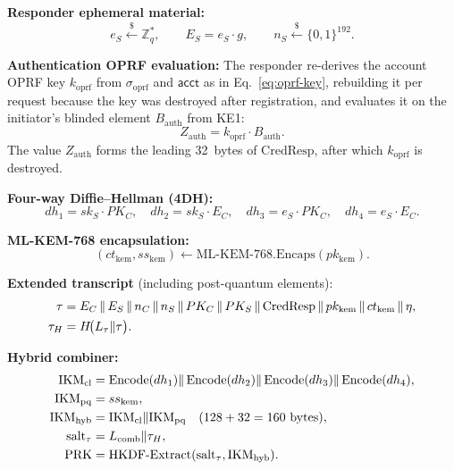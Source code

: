 \documentclass[preprint,12pt]{elsarticle}
\newcommand{\acct}{\mathsf{acct}}
\newcommand{\sigoprf}{\sigma_{\mathrm{oprf}}}
\newcommand{\Label}[1]{L_{\mathrm{#1}}}
\theoremstyle{remark}
\begin{document}
\textbf{Responder ephemeral material:}
\begin{equation}
  e_S \xleftarrow{\$} \mathbb{Z}_q^*,\qquad
  E_S = e_S \cdot g,\qquad
  n_S \xleftarrow{\$} \{0,1\}^{192}.
\end{equation}

\textbf{Authentication OPRF evaluation:} The responder re-derives the
account OPRF key $k_{\mathrm{oprf}}$ from $\sigoprf$ and $\acct$ as in
Eq.~\eqref{eq:oprf-key}, rebuilding it per request because the key was
destroyed after registration, and evaluates it on the initiator's
blinded element $B_{\mathrm{auth}}$ from KE1:
\begin{equation}
  Z_{\mathrm{auth}} = k_{\mathrm{oprf}} \cdot B_{\mathrm{auth}}.
\end{equation}
The value $Z_{\mathrm{auth}}$ forms the leading 32~bytes of
$\mathrm{CredResp}$, after which $k_{\mathrm{oprf}}$ is destroyed.

\textbf{Four-way Diffie--Hellman (4DH):}
\begin{equation}
  dh_1 = sk_S \cdot PK_C,\quad
  dh_2 = sk_S \cdot E_C,\quad
  dh_3 = e_S \cdot PK_C,\quad
  dh_4 = e_S \cdot E_C.
\end{equation}

\textbf{ML-KEM-768 encapsulation:}
\begin{equation}
  (ct_{\mathrm{kem}}, ss_{\mathrm{kem}})
    \leftarrow \mathrm{ML\text{-}KEM\text{-}768.Encaps}(pk_{\mathrm{kem}}).
\end{equation}

\textbf{Extended transcript} (including post-quantum elements):
\begin{align}
  \tau &= E_C \,\|\, E_S \,\|\, n_C \,\|\, n_S
         \,\|\, PK_C \,\|\, PK_S \,\|\,
         \mathrm{CredResp} \,\|\, pk_{\mathrm{kem}}
         \,\|\, ct_{\mathrm{kem}} \,\|\, \eta,
         \notag\\
  \tau_H &= H\!\bigl(L_{\tau} \| \tau\bigr).
  \label{eq:hybrid-transcript}
\end{align}

\textbf{Hybrid combiner:}
\begin{align}
  \mathrm{IKM}_{\mathrm{cl}}
    &= \operatorname{Encode}(dh_1) \| \operatorname{Encode}(dh_2)
       \| \operatorname{Encode}(dh_3) \| \operatorname{Encode}(dh_4),
  \notag\\
  \mathrm{IKM}_{\mathrm{pq}} &= ss_{\mathrm{kem}},
  \notag\\
  \mathrm{IKM}_{\mathrm{hyb}} &= \mathrm{IKM}_{\mathrm{cl}} \|
    \mathrm{IKM}_{\mathrm{pq}}
    \quad(128 + 32 = 160~\text{bytes}),
  \notag\\
  \mathrm{salt}_{\tau} &= \Label{comb} \| \tau_H,
  \notag\\
  \mathrm{PRK} &= \mathrm{HKDF\text{-}Extract}(\mathrm{salt}_{\tau},
    \mathrm{IKM}_{\mathrm{hyb}}).
  \label{eq:hybrid-prk}
\end{align}
\end{document}
